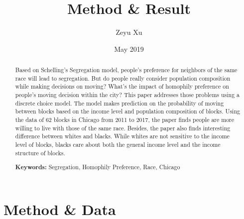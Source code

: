 \documentclass{article}
\title{Method \& Result}
\author{Zeyu Xu}
\date{May 2019}
\begin{document}
\maketitle
\begin{abstract}
Based on Schelling's Segregation model, people's preference for neighbors of the same race will lead to segregation. But do people really consider population composition while making decisions on moving? What's the impact of homophily preference on people's moving decision within the city? This paper addresses those problems using a discrete choice model. The model makes prediction on the probability of moving between blocks based on the income level and population composition of blocks. Using the data of 62 blocks in Chicago from 2011 to 2017, the paper finds people are more willing to live with those of the same race. Besides, the paper also finds interesting difference between whites and blacks. While whites are not sensitive to the income level of blocks, blacks care about both the general income level and the income structure of blocks.
\par
\textbf{Keywords:} Segregation, Homophily Preference, Race, Chicago    
\end{abstract}
\newpage
\section{Method \& Data}
\end{document}
